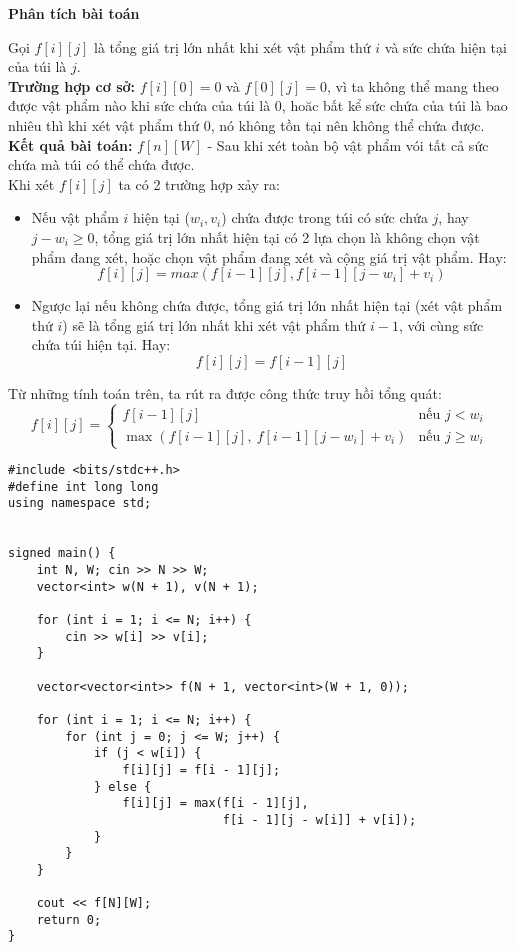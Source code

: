 \textbf{Phân tích bài toán}

Gọi \(f[i][j]\) là tổng giá trị lớn nhất khi xét vật phẩm thứ $i$ và sức chứa hiện tại của túi là $j$. \\

\textbf{Trường hợp cơ sở:} $f[i][0] = 0$ và $f[0][j] = 0$, vì ta không thể mang theo được vật phẩm nào khi sức chứa của túi là 0, hoăc bất kể sức chứa của túi là bao nhiêu thì khi xét vật phẩm thứ 0, nó không tồn tại nên không thể chứa được. \\

\textbf{Kết quả bài toán:} $f[n][W]$ - Sau khi xét toàn bộ vật phẩm vói tất cả sức chứa mà túi có thể chứa được.\\

Khi xét $f[i][j]$ ta có 2 trường hợp xảy ra:
\begin{itemize}
    \item Nếu vật phẩm $i$ hiện tại (\(w_i, v_i\)) chứa được trong túi có sức chứa $j$, hay $j - w_i \geq 0$, tổng giá trị lớn nhất hiện tại có 2 lựa chọn là không chọn vật phẩm đang xét, hoặc chọn vật phẩm đang xét và cộng giá trị vật phẩm. Hay:
    \[
    f[i][j] = max(f[i - 1][j], f[i - 1][j - w_i] + v_i)
    \]
    \item Ngược lại nếu không chứa được, tổng giá trị lớn nhất hiện tại (xét vật phẩm thứ $i$) sẽ là tổng giá trị lớn nhất khi xét vật phẩm thứ $i - 1$, với cùng sức chứa túi hiện tại. Hay:
    \[
    f[i][j] = f[i - 1][j]
    \]
\end{itemize}

Từ những tính toán trên, ta rút ra được công thức truy hồi tổng quát:
\[
f[i][j] =
\begin{cases}
    f[i - 1][j] & \text{nếu } j < w_i \\
    \max(f[i - 1][j],\ f[i - 1][j - w_i] + v_i) & \text{nếu } j \geq w_i
\end{cases}
\]

\begin{lstlisting}[title=\centering \textbf{Cài đặt}]
#include <bits/stdc++.h>
#define int long long
using namespace std;


signed main() {
    int N, W; cin >> N >> W;
    vector<int> w(N + 1), v(N + 1);

    for (int i = 1; i <= N; i++) {
        cin >> w[i] >> v[i];
    }

    vector<vector<int>> f(N + 1, vector<int>(W + 1, 0));

    for (int i = 1; i <= N; i++) {
        for (int j = 0; j <= W; j++) {
            if (j < w[i]) {
                f[i][j] = f[i - 1][j];
            } else {
                f[i][j] = max(f[i - 1][j],
                              f[i - 1][j - w[i]] + v[i]);
            }
        }
    }

    cout << f[N][W];
    return 0;
}

\end{lstlisting}
